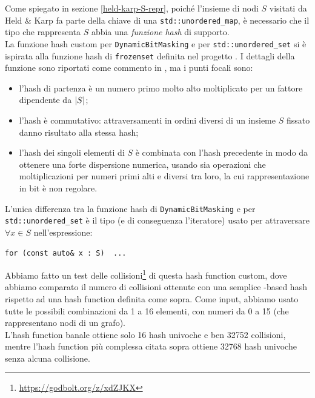 Come spiegato in sezione \ref{held-karp-S-repr}, poiché l'insieme di nodi $S$ visitati da Held \& Karp fa parte della chiave di
una \texttt{std::unordered_map}, è necessario che il tipo che rappresenta $S$ abbia una \textit{funzione hash} di supporto. \\

\noindent La funzione hash custom per \texttt{DynamicBitMasking} e per \texttt{std::unordered_set} si è ispirata alla funzione hash di \texttt{frozenset} definita nel progetto .
I dettagli della funzione sono riportati come commento in , ma i punti focali sono:

\begin{itemize}
    \item l'hash di partenza è un numero primo molto alto moltiplicato per un fattore dipendente da $\abs{S}$;
    \item l'hash è commutativo: attraversamenti in ordini diversi di un insieme $S$ fissato danno risultato alla stessa hash;
    \item l'hash dei singoli elementi di $S$ è combinata con l'hash precedente in modo da ottenere una forte dispersione numerica, usando sia operazioni  che moltiplicazioni per numeri primi alti e diversi tra loro, la cui rappresentazione in bit è non regolare.
\end{itemize}

\noindent L'unica differenza tra la funzione hash di \texttt{DynamicBitMasking} e per \texttt{std::unordered_set} è il tipo (e di conseguenza l'iteratore)
usato per attraversare $\forall x \in S$ nell'espressione:

\begin{center}
    \texttt{for (const auto& x : S) { ... } }
\end{center}

\noindent Abbiamo fatto un test delle collisioni\footnote{\url{https://godbolt.org/z/xdZJKX}} di questa hash function custom, dove abbiamo comparato il numero di collisioni ottenute con una semplice -based hash
rispetto ad una hash function definita come sopra.
Come input, abbiamo usato tutte le possibili combinazioni da 1 a 16 elementi, con numeri da 0 a 15 (che rappresentano nodi di un grafo). \\

\noindent L'hash function banale ottiene solo 16 hash univoche e ben 32752 collisioni, mentre l'hash function più complessa citata sopra ottiene 32768
hash univoche senza alcuna collisione. \\

